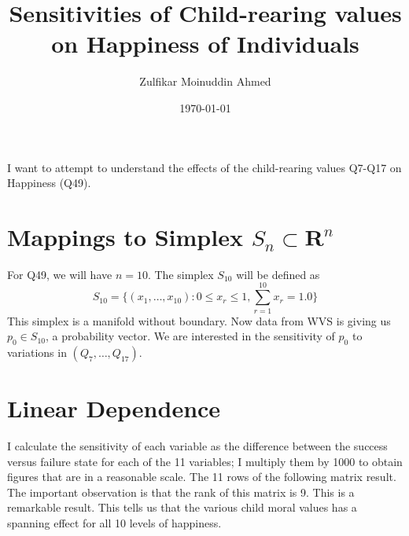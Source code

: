 \documentclass{amsart}
\title{Sensitivities of Child-rearing values on Happiness of Individuals}
\author{Zulfikar Moinuddin Ahmed}
\date{\today}
\begin{document}
\maketitle

I want to attempt to understand the effects of the child-rearing values Q7-Q17 on Happiness (Q49).

\section{Mappings to Simplex $S_n \subset \mathbf{R}^n$}

For Q49, we will have $n=10$.  The simplex $S_10$ will be defined as
\[
S_{10} = \{(x_1,\dots,x_{10}): 0 \le x_r \le 1, \sum_{r=1}^{10} x_r = 1.0 \}
\]
This simplex is a manifold without boundary.  Now data from WVS is giving us $p_0 \in S_{10}$, a probability vector.  We are interested in the sensitivity of $p_0$ to variations in $(Q_7,\dots, Q_{17})$.

\section{Linear Dependence}

I calculate the sensitivity of each variable as the difference between the success versus failure state for each of the 11 variables; I multiply them by 1000 to obtain figures that are in a reasonable scale.  The 11 rows of the following matrix result.  The important observation is that the rank of this matrix is 9.  This is a remarkable result.  This tells us that the various child moral values has a spanning effect for all 10 levels of happiness.
\end{document}
